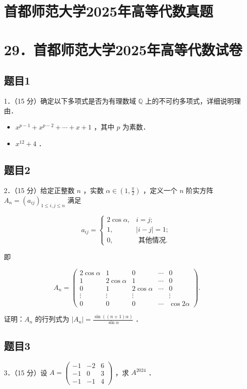 \documentclass{article}
\begin{document}
\section*{首都师范大学2025年高等代数真题}
\section*{29．首都师范大学2025年高等代数试卷}

\subsection{题目1}
1．（15 分）确定以下多项式是否为有理数域 \(\mathbb{Q}\) 上的不可约多项式，详细说明理由．

\begin{itemize}
  \item[（1）] \(x^{p-1}+x^{p-2}+\cdots+x+1\) ，其中 \(p\) 为素数．
  \item[（2）] \(x^{12}+4\) ．
\end{itemize}

\subsection{题目2}
2．（15 分）给定正整数 \(n\) ，实数 \(\alpha \in\left(1, \frac{\pi}{2}\right)\) ，定义一个 \(n\) 阶实方阵 \(A_{n}=\left(a_{i j}\right)_{1 \leq i, j \leq n}\) 满足

\[
a_{i j}= \begin{cases}2 \cos \alpha, & i=j ; \\ 1, & |i-j|=1 ; \\ 0, & \text { 其他情况. }\end{cases}
\]

即

\[
A_{n}=\left(\begin{array}{ccccc}
2 \cos \alpha & 1 & 0 & \cdots & 0 \\
1 & 2 \cos \alpha & 1 & \cdots & 0 \\
0 & 1 & 2 \cos \alpha & \cdots & 0 \\
\vdots & \vdots & \vdots & & \vdots \\
0 & 0 & 0 & \cdots & \cos 2 \alpha
\end{array}\right) .
\]

证明：\(A_{n}\) 的行列式为 \(\left|A_{n}\right|=\frac{\sin ((n+1) \alpha)}{\sin \alpha}\) ．

\subsection{题目3}
3．（15 分）设 \(A=\left(\begin{array}{ccc}-1 & -2 & 6 \\ -1 & 0 & 3 \\ -1 & -1 & 4\end{array}\right)\) ，求 \(A^{2024}\) ．
\end{document}
